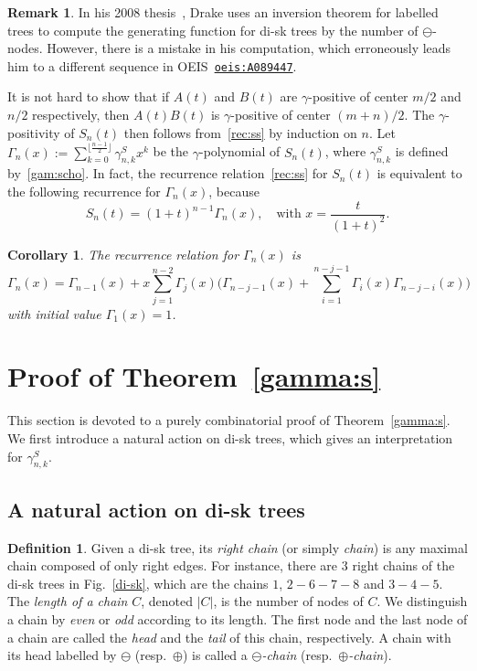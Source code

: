 \documentclass[12pt]{amsart}
\numberwithin{equation}{section}
\theoremstyle{plain}
\newtheorem{corollary}[theorem]{Corollary}
\theoremstyle{definition}
\newtheorem{Def}[theorem]{Definition}
\newtheorem{remark}[theorem]{Remark}
\begin{document}
\begin{remark}
In his 2008 thesis~\cite[Example~1.6.7]{dra}, Drake uses an inversion  theorem for labelled trees to compute the generating function for di-sk trees by the number of $\ominus$-nodes. However, there is a mistake in his computation, which erroneously leads him to a different sequence in OEIS~\href{https://oeis.org/A089447}{\tt{oeis:A089447}}.
\end{remark}


It is not hard to show that if $A(t)$ and $B(t)$ are $\gamma$-positive of center $m/2$ and $n/2$ respectively, then $A(t)B(t)$ is $\gamma$-positive of center 
 $(m+n)/2$.
The $\gamma$-positivity of $S_n(t)$ then follows from~\eqref{rec:ss} by induction on $n$. 
Let $\Gamma_n(x):=\sum_{k=0}^{\lfloor\frac{n-1}{2}\rfloor}\gamma_{n,k}^Sx^k$ be the $\gamma$-polynomial of $S_n(t)$, where $\gamma_{n,k}^S$ is defined by~\eqref{gam:scho}. In fact, the recurrence relation~\eqref{rec:ss} for $S_n(t)$ is equivalent to the following recurrence for $\Gamma_n(x)$, because 
$$
S_n(t)=(1+t)^{n-1}\Gamma_n(x),\quad\text{with $x=\frac{t}{(1+t)^2}$}.
$$
\begin{corollary}The recurrence relation for $\Gamma_n(x)$ is
$$
\Gamma_n(x)=\Gamma_{n-1}(x)+x\sum_{j=1}^{n-2}\Gamma_j(x)\biggl(\Gamma_{n-j-1}(x)+\sum_{i=1}^{n-j-1}\Gamma_i(x)\Gamma_{n-j-i}(x)\biggr)
$$
with initial value $\Gamma_1(x)=1$.
\end{corollary}

 






\section{Proof of Theorem~\ref{gamma:s}}\label{sec:gammasep}

This section is devoted to a purely combinatorial  proof of Theorem~\ref{gamma:s}. We first introduce a natural action on di-sk trees, which gives an interpretation  for $\gamma^S_{n,k}$.

\subsection{A natural action on di-sk trees}
\begin{Def}
Given a di-sk tree, its {\em right chain} (or simply {\em chain}) is any maximal chain composed of only right edges. For instance, there are $3$ right chains of the di-sk trees in Fig.~\ref{di-sk}, which are the chains $1$, $2-6-7-8$ and $3-4-5$. The {\em length of a  chain} $C$, denoted $|C|$, is the number of nodes of $C$. We distinguish a chain by {\em even} or {\em odd} according to its length. The first node and the last node of a chain are called the {\em head} and the {\em tail} of this chain, respectively. A chain with its head labelled by $\ominus$ (resp.~$\oplus$) is called a {\em$\ominus$-chain} (resp.~{\em$\oplus$-chain}).
\end{Def}
\end{document}
